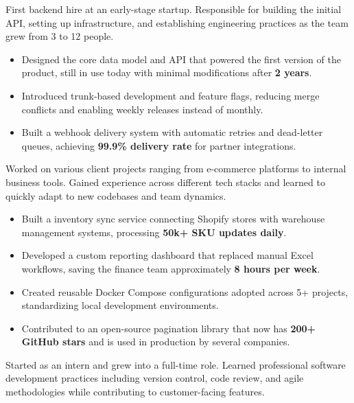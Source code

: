 \documentclass{custom}
\begin{document}
\begin{cvdescription}
First backend hire at an early-stage startup. Responsible for building the
initial API, setting up infrastructure, and establishing engineering practices
as the team grew from 3 to 12 people.
\end{cvdescription}

\begin{itemize}\setlength{\itemsep}{-2pt}
\item Designed the core data model and API that powered the first version of the
product, still in use today with minimal modifications after \textbf{2 years}.
\item Introduced trunk-based development and feature flags, reducing merge
conflicts and enabling weekly releases instead of monthly.
\item Built a webhook delivery system with automatic retries and dead-letter
queues, achieving \textbf{99.9\% delivery rate} for partner integrations.
\end{itemize}

\begin{cvdescription}
Worked on various client projects ranging from e-commerce platforms to internal
business tools. Gained experience across different tech stacks and learned to
quickly adapt to new codebases and team dynamics.
\end{cvdescription}

\begin{itemize}\setlength{\itemsep}{-2pt}
\item Built a inventory sync service connecting Shopify stores with warehouse
management systems, processing \textbf{50k+ SKU updates daily}.
\item Developed a custom reporting dashboard that replaced manual Excel workflows,
saving the finance team approximately \textbf{8 hours per week}.
\item Created reusable Docker Compose configurations adopted across 5+ projects,
standardizing local development environments.
\item Contributed to an open-source pagination library that now has \textbf{200+ GitHub
stars} and is used in production by several companies.
\end{itemize}

\begin{cvdescription}
Started as an intern and grew into a full-time role. Learned professional
software development practices including version control, code review, and
agile methodologies while contributing to customer-facing features.
\end{cvdescription}
\end{document}
